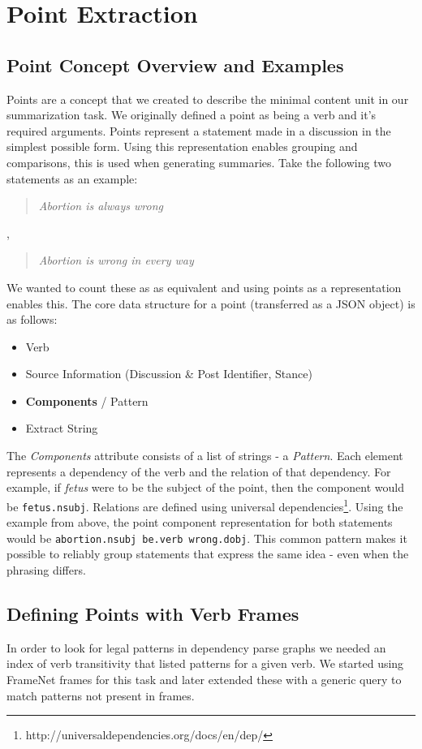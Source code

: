\chapter{Point Extraction\label{chap:point-extraction}}
  \section{Point Concept Overview and Examples}
    Points are a concept that we created to describe the minimal content unit in our summarization task. We originally defined a point as being a verb and it's required arguments. Points represent a statement made in a discussion in the simplest possible form. Using this representation enables grouping and comparisons, this is used when generating summaries. Take the following two statements as an example:

    \blockquote{\textit{Abortion is always wrong}}, \blockquote{\textit{Abortion is wrong in every way}}

    We wanted to count these as as equivalent and using points as a representation enables this. The core data structure for a point (transferred as a JSON object) is as follows:

    \begin{itemize}
      \item{Verb}
      \item{Source Information (Discussion \& Post Identifier, Stance)}
      \item{\textbf{Components} / Pattern}
      \item{Extract String}
    \end{itemize}

    The \textit{Components} attribute consists of a list of strings - a \textit{Pattern}. Each element represents a dependency of the verb and the relation of that dependency. For example, if \textit{fetus} were to be the subject of the point, then the component would be \texttt{fetus.nsubj}. Relations are defined using universal dependencies\footnote{http://universaldependencies.org/docs/en/dep/}. Using the example from above, the point component representation for both statements would be \texttt{abortion.nsubj be.verb wrong.dobj}. This common pattern makes it possible to reliably group statements that express the same idea - even when the phrasing differs.


  \section{Defining Points with Verb Frames}
    In order to look for legal patterns in dependency parse graphs we needed an index of verb transitivity that listed patterns for a given verb. We started using FrameNet frames for this task and later extended these with a generic query to match patterns not present in frames.
